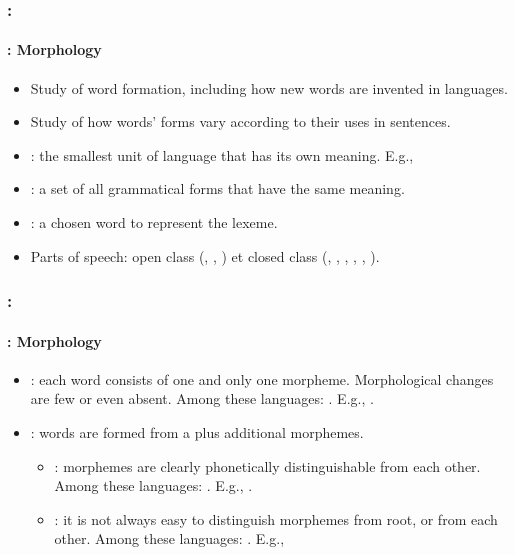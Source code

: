 \documentclass[xcolor=table]{beamer}
\begin{document}
\begin{frame}
	\frametitle{\insertshortsubtitle: \insertsection}
	\framesubtitle{\insertsubsection: Morphology}

	\begin{itemize}
		\item Study of word formation, including how new words are invented in languages.
		\item Study of how words' forms vary according to their uses in sentences.
		\item {}: the smallest unit of language that has its own meaning. 
		E.g., 
		\item {}: a set of all grammatical forms that have the same meaning.
		\item {}: a chosen word to represent the lexeme.
		\item Parts of speech: open class (, , ) et closed class (, , , ,  , ).
	\end{itemize}

\end{frame}


\begin{frame}
	\frametitle{\insertshortsubtitle: \insertsection}
	\framesubtitle{\insertsubsection: Morphology}

	\begin{itemize}
		\item {}: each word consists of one and only one morpheme. 
		Morphological changes are few or even absent.
		Among these languages: . 
		E.g., .
		\item {}: words are formed from a  plus additional morphemes.
		\begin{itemize}
			\item {}: morphemes are clearly phonetically distinguishable from each other.
			Among these languages: . 
			E.g., .
			\item {}: it is not always easy to distinguish morphemes from root, or from each other.
			Among these languages: .
			E.g., 
		\end{itemize}
	\end{itemize}

\end{frame}
\end{document}
